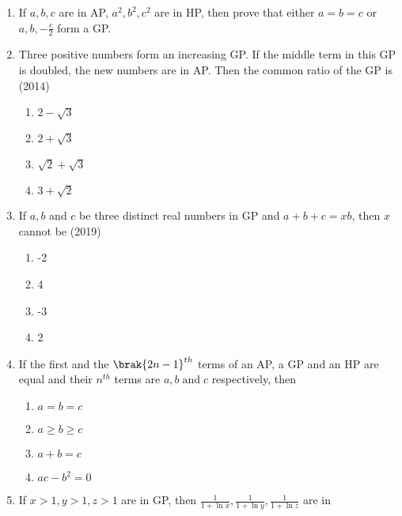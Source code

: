 \begin{enumerate}[label=\thesubsection.\arabic*,ref=\thesubsection.\theenumi]
%
		\hfill {}                             
	\item If $a, b, c$ are in AP, $a^{2}, b^{2}, c^{2} $ are in HP,  then prove that either $ a=b=c $ or $a, b, -\frac{c}{2}$ form a GP.
%		                    
		\hfill {}                            
    \item Three positive numbers form an increasing GP. If the middle term in this GP is doubled,  the new numbers are in AP. Then the common ratio of the GP is 
%    
    \hfill(2014)
    \begin{multicols}{4}
\begin{enumerate}    
    \item$2-\sqrt{3}$
    \item$2+\sqrt{3}$
    \item$\sqrt{2}+\sqrt{3}$
    \item$3+\sqrt{2}$ 
    \end{enumerate}
\end{multicols}
%
  \item{If $a,  b$ and $c$ be three distinct real numbers in GP and $a+b+c=xb$,  then $x$ cannot be \hfill{(2019)}
\begin{multicols}{4}
\begin{enumerate}    
  \item {-2} \item{4}
  \item{-3}
  \item{2}
  \end{enumerate}
\end{multicols}}
	\item If the first and the $\brak{2n-1}^{th}$ terms of an AP,  a GP and an HP are equal and their $n^{th}$ terms are $a,  b \;  \text{and} \;  c$ respectively,  then \hfill{}
%
\begin{multicols}{4}
\begin{enumerate}    
\item $a=b=c$
\item $a \geq b \geq c$
\item $a+b=c$
\item $ac-b^2=0$
\end{enumerate}
\end{multicols}
%
\item If $x>1, y>1, z>1$ are in GP, then $\frac{1}{1+\ln x}, \frac{1}{1+\ln y}, \frac{1}{1+\ln z}$ are in 
\hfill{}
\begin{multicols}{4}
\begin{enumerate}    

\end{enumerate}
\end{multicols}
\end{enumerate}
